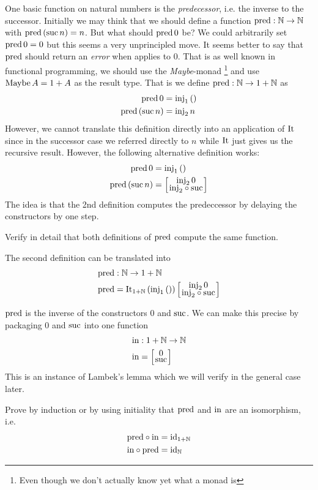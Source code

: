 One basic function on natural numbers is the \emph{predecessor}, i.e. the inverse to the successor. Initially we may think that we should define a function $\mathrm{pred} : \mathbb{N} \to \mathbb{N}$ with $\mathrm{pred}\,(\mathrm{suc}\,n) = n$. But what should $\mathrm{pred}\,0$ be? We could arbitrarily set $\mathrm{pred}\,0 = 0$ but this seems a very unprincipled move. It seems better to say that $\mathrm{pred}$ should return an \emph{error} when applies to $0$. That is as well known in functional programming, we should use the \emph{Maybe}-monad
\footnote{Even though we don't actually know yet what a monad is}
and use $\mathrm{Maybe}\,A = 1 + A$ as the result type. That is we define $\mathrm{pred} : \mathbb{N} \to 1 + \mathbb{N}$ as
\begin{align*}
\mathrm{pred}\,0 & = \mathrm{inj}_1\,() \\
\mathrm{pred}\,(\mathrm{suc}\,n) & = \mathrm{inj}_2\,n
\end{align*}
However, we cannot translate this definition directly into an application of $\mathrm{It}$ since in the successor case we referred directly to $n$ while $\mathrm{It}$ just gives us the recursive result. However, the following alternative definition works:
\begin{align*}
\pred\,0 & = \inj_1\,() \\
\pred\,(\suc\,n) & = \case{\inj_2\,0}{\inj_2 \circ \suc}
\end{align*}
The idea is that the 2nd definition computes the predeccessor by delaying the constructors by one step.
\begin{exercise}
Verify in detail that both definitions of $\mathrm{pred}$ compute the same function.                     
\end{exercise}
The second definition can be translated into 
\begin{align*}
& \pred : \Nat \to 1+\Nat \\
& \pred = \It_{1+\Nat}\,(\inj_1\,())\, \case{\inj_2\,0}{\inj_2 \circ \suc}
\end{align*}

$\mathrm{pred}$ is the inverse of the constructors $0$ and $\mathrm{suc}$. We can make this precise by packaging $0$ and $\mathrm{suc}$ into one function 
\begin{align*}
& \inn : 1+\Nat \to \Nat \\
& \inn = \case{0}{\suc} 
\end{align*}
This is an instance of Lambek's lemma which we will verify in the general case later. 
\begin{exercise}
  Prove by induction or by using initiality that $\mathrm{pred}$ and $\mathrm{in}$ are an isomorphism, i.e.
  \begin{align*}
    \mathrm{pred} \circ \mathrm{in} & = \mathrm{id}_{1+\mathbb{N}} \\
    \mathrm{in} \circ \mathrm{pred} & = \mathrm{id}_{\mathbb{N}}
  \end{align*}
\end{exercise}

